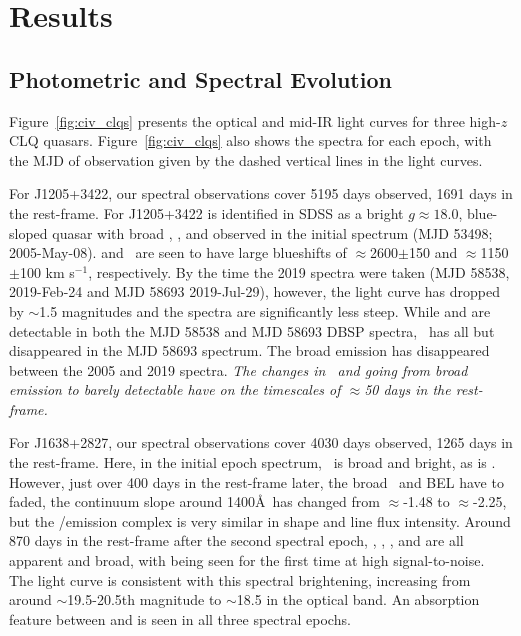 \documentclass[a4paper,fleqn,usenatbib]{mnras}
\begin{document}
\section{Results}
\subsection{Photometric and Spectral Evolution}
Figure~\ref{fig:civ_clqs} presents the optical and mid-IR light
curves for three high-$z$ CLQ quasars.  Figure~\ref{fig:civ_clqs} also
shows the spectra for each epoch, with the MJD of observation given by
the dashed vertical lines in the light curves.

For J1205+3422, our spectral observations cover 5195 days observed, 1691 days
in the rest-frame. For J1205+3422 is identified in SDSS as a bright
$g\approx18.0$, blue-sloped quasar with broad \siiv, \civ, \ciii and
\mgii observed in the initial spectrum (MJD 53498; 2005-May-08). \ciii
and \civ\ are seen to have large blueshifts of $\approx$2600$\pm$150
and $\approx$1150$\pm$100 km s$^{-1}$, respectively.  By the time the
2019 spectra were taken (MJD 58538, 2019-Feb-24 and MJD 58693
2019-Jul-29), however, the light curve has dropped by $\sim$1.5
magnitudes and the spectra are significantly less steep.  While \lya
and \nv are detectable in both the MJD 58538 and MJD 58693 DBSP
spectra, \civ\ has all but disappeared in the MJD 58693 spectrum.  The
broad \ciii emission has disappeared between the 2005 and 2019
spectra. {\it The changes in \civ\ and \ciii going from broad emission to
barely detectable have on the timescales of $\approx$50 days in the rest-frame.} 

For J1638+2827, our spectral observations cover 4030 days observed, 1265 days
in the rest-frame. Here, in the initial epoch spectrum, \civ\ is broad
and bright, as is \ciii. However, just over 400 days in the rest-frame
later, the broad \civ\ and \ciii BEL have to faded, the continuum
slope around 1400\AA\ has changed from $\approx$-1.48 to
$\approx$-2.25, but the \lya/\nv emission complex is very similar in
shape and line flux intensity. Around 870 days in the rest-frame after
the second spectral epoch, \lya, \nv, \civ, \ciii and \mgii are all
apparent and broad, with \mgii being seen for the first time at high
signal-to-noise. The light curve is consistent with this spectral
brightening, increasing from around $\sim$19.5-20.5th magnitude to
$\sim$18.5 in the optical band. An absorption feature between  \lya and \nv
is seen in all three spectral epochs. 
\end{document}
